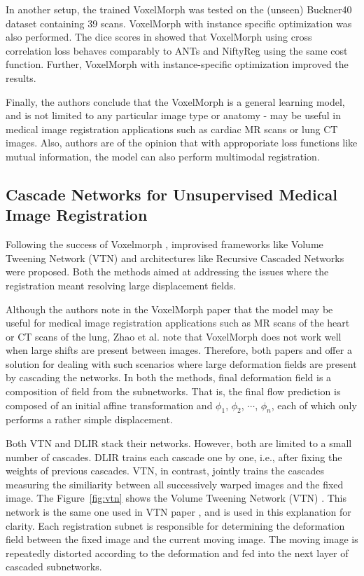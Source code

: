 \documentclass{book}
\begin{document}
	In another setup, the trained VoxelMorph was tested on the (unseen) Buckner40 dataset containing 39 scans. VoxelMorph with instance specific optimization was also performed. The dice scores in showed that VoxelMorph using cross correlation loss behaves comparably to ANTs and NiftyReg using the same cost function. Further, VoxelMorph with instance-specific optimization improved the results.
	
	Finally, the authors conclude that the VoxelMorph is a general learning model, and is not limited to any particular image type or anatomy - may be useful in medical image registration applications such as cardiac MR scans or lung CT images. Also, authors are of the opinion that with approporiate loss functions like mutual information, the model can also perform multimodal registration.
	
	\subsection{Cascade Networks for Unsupervised Medical Image Registration}
	Following the success of Voxelmorph \cite{Balakrishnan_2019}, improvised frameworks like Volume Tweening Network (VTN) \cite{8889674} and architectures like Recursive Cascaded Networks \cite{Zhao_2019} were proposed. Both the methods aimed at addressing the issues where the registration meant resolving large displacement fields.
	
	Although the authors note in the VoxelMorph paper \cite{Balakrishnan_2019} that the model may be useful for medical image registration applications such as MR scans of the heart or CT scans of the lung, Zhao et al. \cite{8889674} note that VoxelMorph does not work well when large shifts are present between images. Therefore, both papers \cite{8889674} and \cite{Balakrishnan_2019} offer a solution for dealing with such scenarios where large deformation fields are present by cascading the networks. In both the methods, final deformation field is a composition of field from the subnetworks. That is, the final flow prediction is composed of an initial affine transformation and $\phi_1$, $\phi_2$, $\cdots$, $\phi_n$, each of which only performs a rather simple displacement.
	
	Both VTN \cite{8889674} and DLIR \cite{de_Vos_2019} stack their networks. However, both are limited to a small number of cascades. DLIR trains each cascade one by one, i.e., after fixing the weights of previous cascades. VTN, in contrast, jointly trains the cascades measuring the similiarity between all successively warped images and the fixed image. The Figure~\ref{fig:vtn} shows the Volume Tweening Network (VTN) \cite{8889674}. This network is the same one used in VTN paper \cite{8889674}, and is used in this explanation for clarity. Each registration subnet is responsible for determining the deformation field between the fixed image and the current moving image. The moving image is repeatedly distorted according to the deformation and fed into the next layer of cascaded subnetworks.
	
\end{document}
